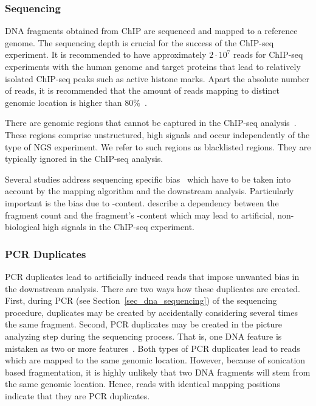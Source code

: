 \subsubsection{Sequencing}
\label{sec_challenges_sequencing}
DNA fragments obtained from ChIP are sequenced and mapped to a reference genome. 
The sequencing depth is crucial for the success of the ChIP-seq experiment. 
It is recommended to have approximately $2 \cdot 10^7$ reads for ChIP-seq experiments with the human genome and target proteins that lead to relatively isolated ChIP-seq peaks such as active histone marks. 
Apart the absolute number of reads, it is recommended that the amount of reads mapping to distinct genomic location is higher than $80\%$~\citep{Furey2012}.

There are genomic regions that cannot be captured in the ChIP-seq analysis~\citep{Dunham2012}.
These regions comprise unstructured, high signals and occur independently of the type of NGS experiment.
We refer to such regions as blacklisted regions.
They are typically ignored in the ChIP-seq analysis.

Several studies address sequencing specific bias~\citep{Khrameeva2012, Allhoff2013} which have to be taken into account by the mapping algorithm and the downstream analysis.
Particularly important is the bias due to -content.
\cite{Benjamini2012} describe a dependency between the fragment count and the fragment's -content which may lead to artificial, non-biological high signals in the ChIP-seq experiment.

\subsubsection{PCR Duplicates}
\label{sec_challenges_pcr_duplicates}
PCR duplicates lead to artificially induced reads that impose unwanted bias in the downstream analysis.
There are two ways how these duplicates are created.
First, during PCR (see Section~\ref{sec_dna_sequencing}) of the sequencing procedure, duplicates may be created by accidentally considering several times the same fragment.
Second, PCR duplicates may be created in the picture analyzing step during the sequencing process.
That is, one DNA feature is mistaken as two or more features~\citep{Meyer2014, Maze2014}.
Both types of PCR duplicates lead to reads which are mapped to the same genomic location.
However, because of sonication based fragmentation, it is highly unlikely that two DNA fragments will stem from the same genomic location.
Hence, reads with identical mapping positions indicate that they are PCR duplicates.


